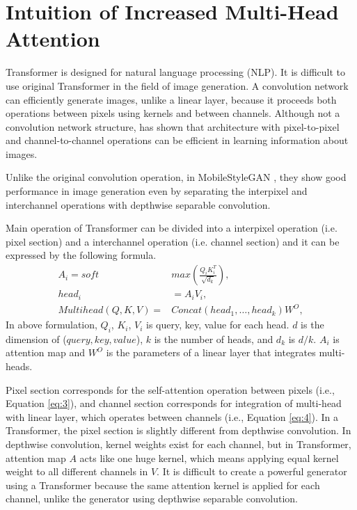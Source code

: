 \documentclass[10pt,twocolumn,letterpaper]{article}
\begin{document}
\section{Intuition of Increased Multi-Head Attention}
\label{app:C}
Transformer is designed for natural language processing (NLP). It is difficult to use original 
Transformer in the field of image generation.
A convolution network can efficiently generate images, unlike a linear layer, because it proceeds both operations between pixels using kernels and between channels. Although not a convolution network structure, \cite{tolstikhin2021mlpmixer} has shown that architecture with pixel-to-pixel and channel-to-channel operations can be efficient in learning information about images.

Unlike the original convolution operation, in MobileStyleGAN \cite{belousov2021mobilestylegan}, they show good performance in image generation even by separating the interpixel and interchannel operations with depthwise separable convolution.

Main operation of Transformer can be divided into a interpixel operation (i.e. pixel section) and a interchannel operation (i.e. channel section) and it can be expressed by the following formula.
\begin{align}
    \label{eq:2}
    A_{i} = soft&max(\frac{Q_{i}K_{i}^{T}}{\sqrt{d_{k}}}),\\
    \label{eq:3}
    head_{i} &= A_{i}V_{i},\\
    \label{eq:4}
    Multihead(Q, K, V) = &Concat(head_{1},\dots,head_{k})W^{O},
\end{align}
In above formulation, $Q_{i}$, $K_{i}$, $V_{i}$ is query, key, value for each head. $d$ is the dimension of ($query, key, value$), $k$ is the number of heads, and $d_{k}$ is $d / k$.  $A_{i}$ is attention map and $W^{O}$ is the parameters of a linear layer that integrates multi-heads.  

 Pixel section corresponds for the self-attention operation between pixels (i.e., Equation \ref{eq:3}), and channel section corresponds for integration of multi-head with linear layer, which operates between channels (i.e., Equation \ref{eq:4}). In a Transformer, the pixel section is slightly different from depthwise convolution. In depthwise convolution, kernel weights exist for each channel, but in Transformer, attention map $A$ acts like one huge kernel, which means applying equal kernel weight to all different channels in $V$.  
It is difficult to create a powerful generator using a Transformer because the same attention kernel is applied for each channel, unlike the generator using depthwise separable convolution. 
\end{document}
